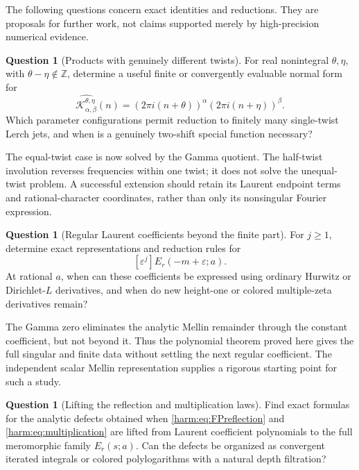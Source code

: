 \documentclass[11pt,letterpaper]{article}
\numberwithin{equation}{section}
\theoremstyle{plain}
\theoremstyle{definition}
\newtheorem{question}[theorem]{Question}
\theoremstyle{remark}
\begin{document}
The following questions concern exact identities and reductions.
They are proposals for further work, not claims supported merely by
high-precision numerical evidence.

\begin{question}[Products with genuinely different twists]
\label{future:q:unequaltwists}
For real nonintegral \(\theta,\eta\), with
\(\theta-\eta\notin\mathbb Z\), determine a useful finite or
convergently evaluable normal form for
\[
 \widehat{\mathcal K_{\alpha,\beta}^{\theta,\eta}}(n)
 =(2\pi i(n+\theta))^\alpha
  (2\pi i(n+\eta))^\beta .
\]
Which parameter configurations permit reduction to finitely many
single-twist Lerch jets, and when is a genuinely two-shift
special function necessary?
\end{question}

The equal-twist case is now solved by the Gamma quotient.
The half-twist involution reverses frequencies within one twist;
it does not solve the unequal-twist problem. A successful extension
should retain its Laurent endpoint terms and rational-character
coordinates, rather than only its nonsingular Fourier expression.

\begin{question}[Regular Laurent coefficients beyond the finite part]
\label{future:q:regularcoefficients}
For \(j\geq1\), determine exact representations and reduction rules
for
\[
 [\varepsilon^j]E_r(-m+\varepsilon;a).
\]
At rational \(a\), when can these coefficients be expressed using
ordinary Hurwitz or Dirichlet-\(L\) derivatives, and when do new
height-one or colored multiple-zeta derivatives remain?
\end{question}

The Gamma zero eliminates the analytic Mellin remainder through
the constant coefficient, but not beyond it. Thus the polynomial
theorem proved here gives the full singular and finite data without
settling the next regular coefficient. The independent scalar
Mellin representation supplies a rigorous starting point for
such a study.

\begin{question}[Lifting the reflection and multiplication laws]
\label{future:q:lift}
Find exact formulas for the analytic defects obtained when
\eqref{harm:eq:FPreflection} and \eqref{harm:eq:multiplication}
are lifted from Laurent coefficient polynomials to the full
meromorphic family \(E_r(s;a)\).
Can the defects be organized as convergent iterated integrals or
colored polylogarithms with a natural depth filtration?
\end{question}
\end{document}
